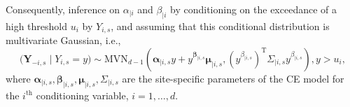 \documentclass[
  12pt]{article}
\DeclareMathOperator{\CE}{\mathrm{CE}}
\newcommand{\mvmean}[1]{\symbf{\alpha}_{\mid i, #1} y + y^{\symbf{\beta}_{\mid i, #1}} \symbf{\mu}_{\mid i, #1}}
\newcommand{\mvcov}[1]{\left(y^{\beta_{\mid i, #1}}\right)^{\mathrm{T}} \Sigma_{\mid i, #1} y^{\beta_{\mid i, #1}}}
\begin{document}
Consequently, inference on $\alpha_{\mid i}$ and $\beta_{\mid i}$ by conditioning on the exceedance of a high threshold $u_i$ by $Y_{i, s}$, and assuming that this conditional distribution is multivariate Gaussian, i.e.,\@
\begin{equation}~\label{eq:ce_norm}
  \bigl(\symbf{Y}_{-i, s} \mid Y_{i, s} = y\bigr) \sim \mbox{MVN}_{d-1}\left(\mvmean{s}, \mvcov{s}\right), y > u_i,
\end{equation}
where $\symbf{\alpha}_{\mid i, s}, \symbf{\beta}_{\mid i, s}, \symbf{\mu}_{\mid i, s}, \Sigma_{\mid i, s}$ are the site-specific parameters of the CE model for the $i^{\text{th}}$ conditioning variable, $i = 1, \ldots, d$.  
\end{document}
